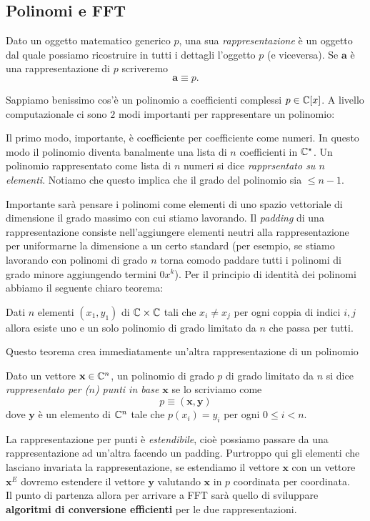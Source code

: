 \documentclass[11pt]{scrartcl}
\begin{document}
	\subsection{Polinomi e FFT}
	\begin{definition}[Rappresentazione]
		Dato un oggetto matematico generico $p$, una sua \textit{rappresentazione} è un oggetto dal quale possiamo ricostruire in tutti i dettagli l'oggetto $p$ (e viceversa). Se $\mathbf{a}$ è una rappresentazione di $p$ scriveremo
		$$\mathbf{a}\equiv p.$$
	\end{definition}
	Sappiamo benissimo cos'è un polinomio a coefficienti complessi $p\in \mathbb C[x]$. A livello computazionale ci sono $2$ modi importanti per rappresentare un polinomio:
	\begin{definition}
		Il primo modo, importante, è coefficiente per coefficiente come numeri. In questo modo il polinomio diventa banalmente una lista di $n$ coefficienti in $\mathbb C^\star$. Un polinomio rappresentato come lista di $n$ numeri si dice \textit{rapprsentato su $n$ elementi}. Notiamo che questo implica che il grado del polinomio sia $\le n-1$.
	\end{definition}
	Importante sarà pensare i polinomi come elementi di uno spazio vettoriale di dimensione il grado massimo con cui stiamo lavorando. Il \textit{padding} di una rappresentazione consiste nell'aggiungere elementi neutri alla rappresentazione per uniformarne la dimensione a un certo standard (per esempio, se stiamo lavorando con polinomi di grado $n$ torna comodo paddare tutti i polinomi di grado minore aggiungendo termini $0x^k$). Per il principio di identità dei polinomi abbiamo il seguente chiaro teorema:
	\begin{theorem}[Di interpolazione]
		Dati $n$ elementi $(x_1,y_1)$ di $\mathbb C\times\mathbb C$ tali che $x_i\ne x_j$ per ogni coppia di indici $i,j$ allora esiste uno e un solo polinomio di grado limitato da $n$ che passa per tutti.
	\end{theorem}
	Questo teorema crea immediatamente un'altra rappresentazione di un polinomio 
	\begin{definition}
		Dato un vettore $\mathbf{x}\in\mathbb C^n$, un polinomio di grado $p$ di grado limitato da $n$ si dice \textit{rappresentato per ($n$) punti in base $\mathbf{x}$} se lo scriviamo come
		$$p\equiv (\mathbf{x},\mathbf{y})$$
		dove $\mathbf{y}$ è un elemento di $\mathbb C^n$ tale che $p(x_i)=y_i$ per ogni $0\le i< n$.
	\end{definition}
	La rappresentazione per punti è \textit{estendibile}, cioè possiamo passare da una rappresentazione ad un'altra facendo un padding. Purtroppo qui gli elementi che lasciano invariata la rappresentazione, se estendiamo il vettore $\mathbf{x}$ con un vettore $\mathbf{x}^E$ dovremo estendere il vettore $\mathbf{y}$ valutando $\mathbf{x}$ in $p$ coordinata per coordinata. \\
	Il punto di partenza allora per arrivare a FFT sarà quello di sviluppare \textbf{algoritmi di conversione efficienti} per le due rappresentazioni. 
	
\end{document}
